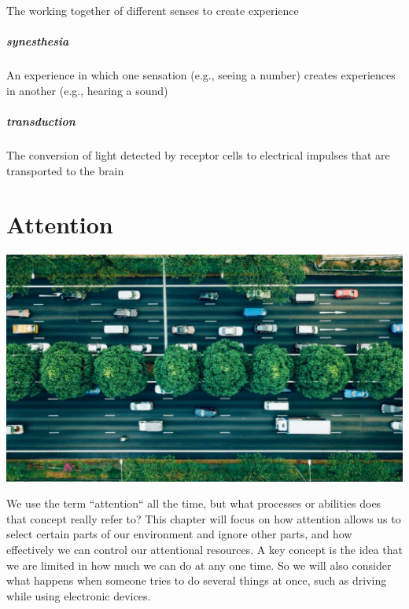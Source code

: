 \documentclass[
]{krantz}
\begin{document}
The working together of different senses to create experience

\paragraph*{synesthesia}\label{synesthesia}

An experience in which one sensation (e.g., seeing a number) creates experiences in another (e.g., hearing a sound)

\paragraph*{transduction}\label{transduction}

The conversion of light detected by receptor cells to electrical impulses that are transported to the brain

\chapter{Attention}\label{attention}

\begin{center}\includegraphics[width=1\linewidth]{images/3_attention/attnhead} \end{center}

We use the term ``attention`` all the time, but what processes or abilities does that concept really refer to? This chapter will focus on how attention allows us to select certain parts of our environment and ignore other parts, and how effectively we can control our attentional resources. A key concept is the idea that we are limited in how much we can do at any one time. So we will also consider what happens when someone tries to do several things at once, such as driving while using electronic devices.
\end{document}
